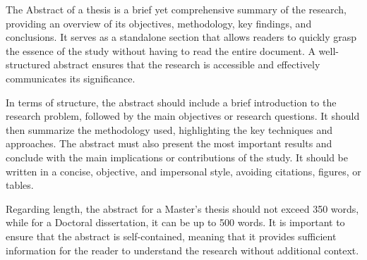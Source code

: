 The Abstract of a thesis is a brief yet comprehensive summary of the research, providing an overview of its objectives, methodology, key findings, and conclusions. It serves as a standalone section that allows readers to quickly grasp the essence of the study without having to read the entire document. A well-structured abstract ensures that the research is accessible and effectively communicates its significance.

In terms of structure, the abstract should include a brief introduction to the research problem, followed by the main objectives or research questions. It should then summarize the methodology used, highlighting the key techniques and approaches. The abstract must also present the most important results and conclude with the main implications or contributions of the study. It should be written in a concise, objective, and impersonal style, avoiding citations, figures, or tables.

Regarding length, the abstract for a Master's thesis should not exceed 350 words, while for a Doctoral dissertation, it can be up to 500 words. It is important to ensure that the abstract is self-contained, meaning that it provides sufficient information for the reader to understand the research without additional context.